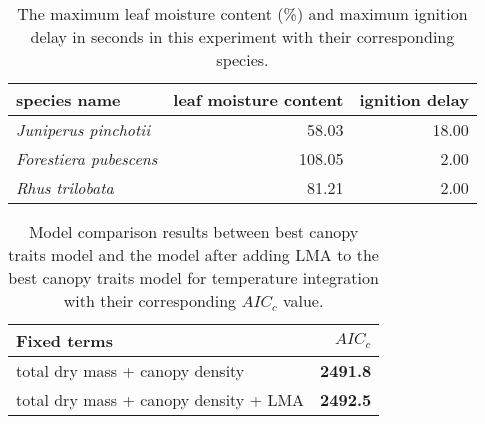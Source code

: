 \documentclass[12pt]{report}
\begin{document}
\begin{table}[ht]
\centering
\caption{The maximum leaf moisture content (\%) and maximum ignition delay in seconds in this experiment with their corresponding species.}
\begin{tabular}{lrr}
  \hline
  \textbf{species name} & \textbf{leaf moisture content} & \textbf{ignition delay} \\ 
  \hline
  \emph{Juniperus pinchotii} & 58.03 & 18.00 \\ 
  \emph{Forestiera pubescens} & 108.05 & 2.00 \\ 
  \emph{Rhus trilobata}  & 81.21 & 2.00\\
   \hline
\end{tabular}
\end{table}



\begin{table}
  \centering
  \caption{Model comparison results between best canopy traits model and the model after adding LMA to the best canopy traits model for temperature integration with their corresponding $AIC_{c}$ value.}
  \vspace{0.5 cm}
  \begin{tabular}{lr}
    \hline
    \textbf{Fixed terms} & $AIC_{c}$ \\
    \hline
    total dry mass + canopy density & \textbf{2491.8}  \\
    total dry mass + canopy density + LMA  & \textbf{2492.5}  \\
  \end{tabular}
\end{table}
\end{document}

